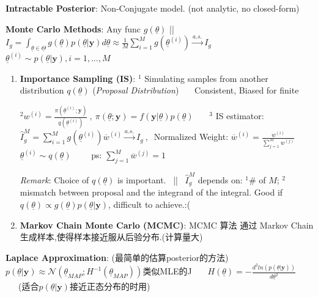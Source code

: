\documentclass[9pt]{article}
\begin{document}
\textbf{Intractable Posterior}:  Non-Conjugate model. (not analytic, no closed-form)

\textbf{Monte Carlo Methods}: Any func $g(\underline{\theta})$ || $I_g=\int_{\underline{\theta}\in\underline{\Theta}}g(\underline{\theta})p(\underline{\theta}|\mathbf{y})d\underline{\theta}\approx\frac{1}{M}\sum^M_{i=1}g(\underline{\theta}^{(i)})\stackrel{a.s.}{\to}I_g$ \ \ \ $\underline{\theta}^{(i)}\sim p(\underline{\theta}|\mathbf{y}),i=1,...,M$

\begin{enumerate}[itemsep=-2pt, topsep=-2pt]
    \item \textbf{Importance Sampling (IS)}: $^1$ Simulating samples from another distribution $q(\underline{\theta})$ (\textit{Proposal Distribution}) \ \ \ {\scriptsize Consistent, Biased for finite}
    
    \vspace{-5pt}
    {\small $^2w^{(i)}=\frac{\pi(\underline{\theta}^{(i)};\mathbf{y})}{q(\underline{\theta}^{(i)})} \ , \ \pi(\underline{\theta};\mathbf{y})=f(\mathbf{y}|\underline{\theta})p(\underline{\theta})$ \ \ \ $^3$ {\scriptsize IS estimator:} $\widehat{I}^M_g=\sum^M_{i=1}g(\underline{\theta}^{(i)})\overline{w}^{(i)}\stackrel{a.s.}{\to}I_g \ , \ $ {\scriptsize Normalized Weight:} $ \overline{w}^{(i)}=\frac{w^{(i)}}{\sum^M_{j=1}w^{(j)}}$ \ \ \ {\scriptsize $\underline{\theta}^{(i)}\sim q(\underline{\theta})$}} \ \ \ \ {\scriptsize ps: $\sum_{j=1}^{M}\overline{w}^{(j)}=1$}

    {\scriptsize \textit{Remark}:  Choice of $q(\underline{\theta})$ is important. \ || \ $\hat{I}^M_g$ depends on: $^1$\# of $M$; $^2$mismatch between proposal and the integrand of the integral. Good if $q(\underline{\theta})\propto g(\underline{\theta})p(\underline{\theta}|\mathbf{y})$, difficult to achieve.:(}

    \item \textbf{Markov Chain Monte Carlo (MCMC)}: {\footnotesize MCMC 算法 通过 Markov Chain 生成样本,使得样本接近服从后验分布.(计算量大)}
\end{enumerate}

\textbf{Laplace Approximation}: {\tiny (最简单的估算posterior的方法)} {\small $p(\underline{\theta}|\mathbf{y})\approx\mathcal{N}(\underline{\theta}_{MAP};H^{-1}(\underline{\theta}_{MAP}))${\tiny 类似MLE的J} \ \ \ $H(\underline{\theta})=-\frac{d^2ln(p(\underline{\theta}|\mathbf{y}))}{d\underline{\theta}^2}$} \ \ \ {\scriptsize (适合$p(\underline{\theta}|\mathbf{y})$接近正态分布的时用)}
\end{document}

